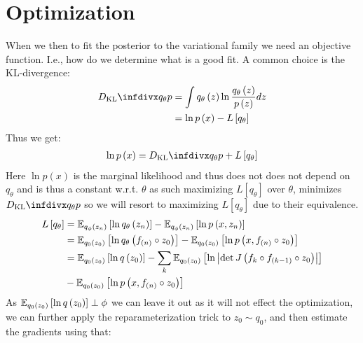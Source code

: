 \section{Optimization}\label{Ch:Opt}
When we then to fit the posterior to the variational family we need an objective function. I.e., how do we determine what is a good fit. A common choice is the KL-divergence:
\begin{align}  
    \kld{q_\theta}{p} & = \int q_\theta\left(z\right)  \ln \frac{q_\theta\left(z\right)}{p\left(z\right)}dz \label{eq:kl_divergence} \\
    & = \ln p\left(x\right) - L\left[q_\theta\right] \nonumber
\end{align}
Thus we get:
\begin{align*}
    \ln p\left(x\right)=\kld{q_\theta}{p} + L\left[q_\theta\right]
\end{align*}
Here $\ln p\left(x\right)$ is the marginal likelihood and thus does not does not depend on $q_\theta$ and is thus a constant w.r.t. $\theta$ as such maximizing $L\left[q_\theta\right]$ over $\theta$, minimizes $\kld{q_\theta}{p}$ so we will resort to maximizing $L\left[q_\theta\right]$ due to their equivalence.
\begin{align*}
    L\left[q_\theta\right] & = \mathbb{E}_{q_\phi\left(z_n\right)}\left[\ln q_\theta\left(z_n\right)\right]-\mathbb{E}_{q_\phi\left(z_n\right)}\left[\ln p\left(x,z_n\right)\right]\\
    & = \mathbb{E}_{q_0\left(z_0\right)}\left[\ln q_\theta\left(f_{\left(n\right)}\circ z_0\right)\right]-\mathbb{E}_{q_0\left(z_0\right)}\left[\ln p\left(x,f_{\left(n\right)}\circ z_0\right)\right]\\
    & = \mathbb{E}_{q_0\left(z_0\right)}\left[\ln q\left(z_0\right)\right]-\sum_k\mathbb{E}_{q_0\left(z_0\right)}\left[\ln\left\lvert\det J\left(f_k \circ f_{\left(k-1\right)}\circ z_0\right)\right\rvert\right] \\&-\mathbb{E}_{q_0\left(z_0\right)}\left[\ln p\left(x,f_{\left(n\right)}\circ z_0\right)\right]
\end{align*}
As $\mathbb{E}_{q_0\left(z_0\right)}\left[\ln q\left(z_0\right)\right]\perp\phi$ we can leave it out as it will not effect the optimization, we can further apply the reparameterization trick to $z_0\sim q_0$, and then estimate the gradients using that:
